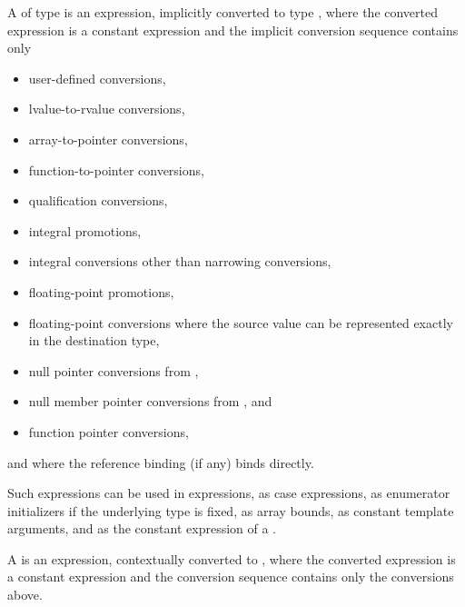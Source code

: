 \pnum
A 
of type  is an
expression, implicitly converted to type , where
the converted expression is a constant expression and the
implicit conversion sequence contains only
\begin{itemize}
\item user-defined conversions,
\item lvalue-to-rvalue conversions,
\item array-to-pointer conversions,
\item function-to-pointer conversions,
\item qualification conversions,
\item integral promotions,
\item integral conversions other than narrowing conversions,
\item floating-point promotions,
\item floating-point conversions where
  the source value can be represented exactly in the destination type,
\item null pointer conversions from ,
\item null member pointer conversions from , and
\item function pointer conversions,
\end{itemize}
and where the reference binding (if any) binds directly.
\begin{note}
Such expressions can be used in 
expressions, as case expressions,
as enumerator initializers if the underlying type is
fixed, as array bounds,
as constant template arguments,
and as the constant expression of a .
\end{note}
%
%

\pnum
A  is
an expression, contextually converted to ,
where the converted expression is a constant expression and
the conversion sequence contains only the conversions above.

